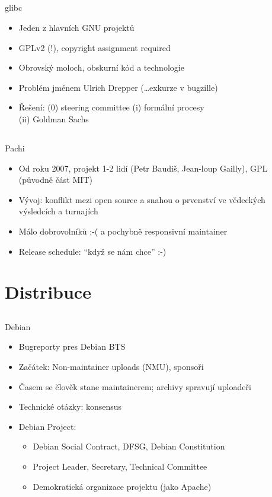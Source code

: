 \documentclass{beamer}
\begin{document}
\subsection{}
\begin{frame}{glibc}
\begin{itemize}
\item Jeden z hlavních GNU projektů
\item GPLv2 (!), copyright assignment required
\item Obrovský moloch, obskurní kód a technologie
\item Problém jménem Ulrich Drepper (\dots exkurze v bugzille)
\item Řešení: (0) steering committee (i) formální procesy \\ (ii) Goldman Sachs
\end{itemize}
\end{frame}

\subsection{}
\begin{frame}{Pachi}
\begin{itemize}
\item Od roku 2007, projekt 1-2 lidí (Petr Baudiš, Jean-loup Gailly), GPL (původně část MIT)
\item Vývoj: konflikt mezi open source a snahou o prvenství ve vědeckých výsledcích a turnajích
\item Málo dobrovolníků :-( a pochybně responsivní maintainer
\item Release schedule: ``když se nám chce'' :-)
\end{itemize}
\end{frame}


\section{Distribuce}

\subsection{}
\begin{frame}{Debian}
\begin{itemize}
\item Bugreporty pres Debian BTS
\item Začátek: Non-maintainer uploads (NMU), sponsoři
\item Časem se člověk stane maintainerem; archivy spravují uploadeři
\item Technické otázky: konsensus
\item Debian Project:
	\begin{itemize}
	\item Debian Social Contract, DFSG, Debian Constitution
	\item Project Leader, Secretary, Technical Committee
	\item Demokratická organizace projektu (jako Apache)
	\end{itemize}
\end{itemize}
\end{frame}
\end{document}
